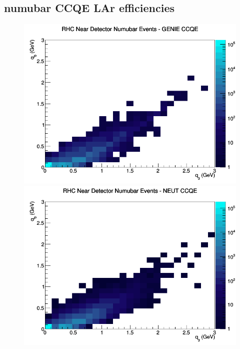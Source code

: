 \documentclass[12pt]{article}
\begin{document}
\subsection{numubar CCQE LAr efficiencies}
\begin{figure}[h]
\includegraphics[width=\linewidth]{eff_q0_q3/LAr/CCQE_RHC_ND_numubar_q3_q0_GENIE.png}
\endminipage
{}
\includegraphics[width=\linewidth]{eff_q0_q3/LAr/CCQE_RHC_ND_numubar_q3_q0_NEUT.png}
\endminipage
{}

\end{figure}
\end{document}

